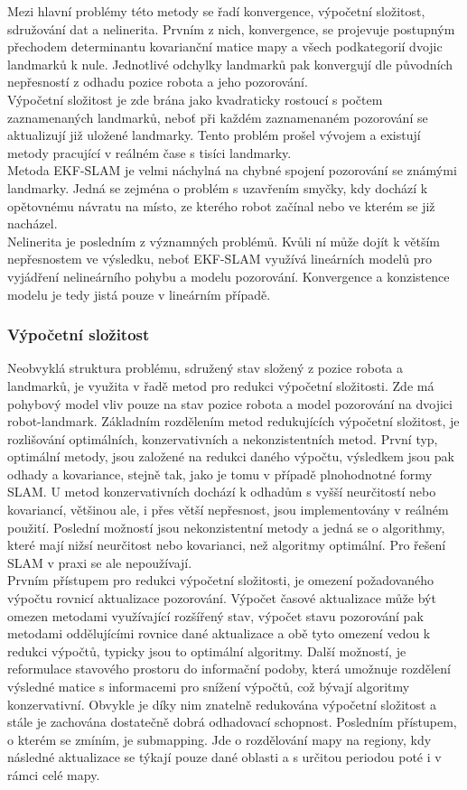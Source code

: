 \documentclass[11pt]{article}
\begin{document}
Mezi hlavní problémy této metody se řadí konvergence, výpočetní složitost, sdružování dat a nelinerita. Prvním z nich, konvergence, se projevuje postupným přechodem determinantu kovarianční matice mapy a všech podkategorií dvojic landmarků k nule. Jednotlivé odchylky landmarků pak konvergují dle původních nepřesností z odhadu pozice robota a jeho pozorování.\\
\indent Výpočetní složitost je zde brána jako kvadraticky rostoucí s počtem zaznamenaných landmarků, neboť při každém zaznamenaném pozorování se aktualizují již uložené landmarky. Tento problém prošel vývojem a existují metody pracující v reálném čase s tisíci landmarky.\\
\indent Metoda EKF-SLAM je velmi náchylná na chybné spojení pozorování se známými landmarky. Jedná se zejména o problém s uzavřením smyčky, kdy dochází k opětovnému návratu na místo, ze kterého robot začínal nebo ve kterém se již nacházel.\\
\indent Nelinerita je posledním z významných problémů. Kvůli ní může dojít k větším nepřesnostem ve výsledku, neboť EKF-SLAM využívá lineárních modelů pro vyjádření nelineárního pohybu a modelu pozorování. Konvergence a konzistence modelu je tedy jistá pouze v lineárním případě. 

\subsubsection{Výpočetní složitost}
Neobvyklá struktura problému, sdružený stav složený z pozice robota a landmarků, je využita v řadě metod pro redukci výpočetní složitosti. Zde má pohybový model vliv pouze na stav pozice robota a model pozorování na dvojici robot-landmark. Základním rozdělením metod redukujících výpočetní složitost, je rozlišování optimálních, konzervativních a nekonzistentních metod. První typ, optimální metody, jsou založené na redukci daného výpočtu, výsledkem jsou pak odhady a kovariance, stejně tak, jako je tomu v případě plnohodnotné formy SLAM. U metod konzervativních dochází k odhadům s vyšší neurčitostí nebo kovariancí, většinou ale, i přes větší nepřesnost, jsou implementovány v reálném použití. Poslední možností jsou nekonzistentní metody a jedná se o algorithmy, které mají nižsí neurčitost nebo kovarianci, než algoritmy optimální. Pro řešení SLAM v praxi se ale nepoužívají.\\
\indent Prvním přístupem pro redukci výpočetní složitosti, je omezení požadovaného výpočtu rovnicí aktualizace pozorování. Výpočet časové aktualizace může být omezen metodami využívající rozšířený stav, výpočet stavu pozorování pak metodami oddělujícími rovnice dané aktualizace a obě tyto omezení vedou k redukci výpočtů, typicky jsou to optimální algoritmy. Další možností, je reformulace stavového prostoru do informační podoby, která umožnuje rozdělení výsledné matice s informacemi pro snížení výpočtů, což bývají algoritmy konzervativní. Obvykle je díky nim znatelně redukována výpočetní složitost a stále je zachována dostatečně dobrá odhadovací schopnost. Posledním přístupem, o kterém se zmíním, je submapping. Jde o rozdělování mapy na regiony, kdy následné aktualizace se týkají pouze dané oblasti a s určitou periodou poté i v rámci celé mapy. 
\end{document}
